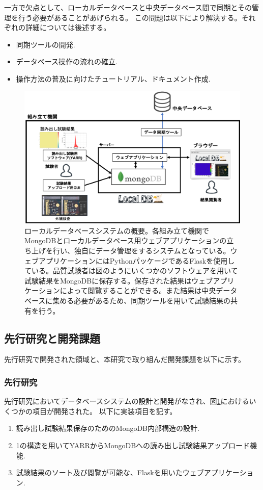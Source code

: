 一方で欠点として、ローカルデータベースと中央データベース間で同期とその管理を行う必要があることがあげられる。
この問題は以下により解決する。それぞれの詳細については後述する。
\begin{itemize}
  \item 同期ツールの開発.
  \item データベース操作の流れの確立.
  \item 操作方法の普及に向けたチュートリアル、ドキュメント作成.
\end{itemize}

\begin{figure}[bpt]\centering
\includegraphics[width=12cm]{./localdb_overview.png}
\caption[ローカルデータベースシステムの概要]{ローカルデータベースシステムの概要。各組み立て機関でMongoDBとローカルデータベース用ウェブアプリケーションの立ち上げを行い、独自にデータ管理をするシステムとなっている。ウェブアプリケーションにはPythonパッケージであるFlaskを使用している。品質試験者は図のようにいくつかのソフトウェアを用いて試験結果をMongoDBに保存する。保存された結果はウェブアプリケーションによって閲覧することができる。また結果は中央データベースに集める必要があるため、同期ツールを用いて試験結果の共有を行う。}
\label{localdb_overview}
\end{figure}

\subsection{先行研究と開発課題}
先行研究で開発された領域と、本研究で取り組んだ開発課題を以下に示す。

\subsubsection{先行研究}
先行研究\cite{4-6}においてデータベースシステムの設計と開発がなされ、図\ref{localdb_overview}におけるいくつかの項目が開発された。
以下に実装項目を記す。
\begin{enumerate}
  \item 読み出し試験結果保存のためのMongoDB内部構造の設計.
  \item 1の構造を用いてYARRからMongoDBへの読み出し試験結果アップロード機能.
  \item 試験結果のソート及び閲覧が可能な、Flaskを用いたウェブアプリケーション. 
\end{enumerate}

